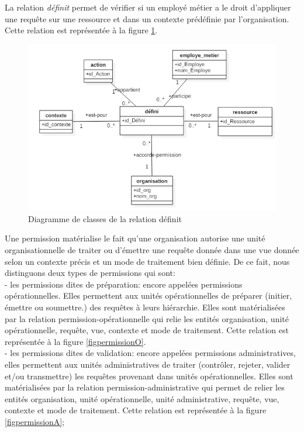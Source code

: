 \label{sectionDéfinit}

 La relation \textit{définit} permet de vérifier si un employé métier a le droit d'appliquer une requête sur une ressource et dans un contexte prédéfinie par l'organisation. Cette relation est représentée à la figure \ref{figdefini}.

\begin{figure}[h!]
    \centering
		\includegraphics[scale=0.7]{chap3/images/defini.png}
    \caption{Diagramme de classes de la relation définit}
	 \label{figdefini}
\end{figure} 

\label{sectionPermission}

Une permission matérialise le fait qu'une organisation autorise une unité organisationnelle de traiter ou d'émettre une requête donnée dans une vue donnée selon un contexte précis et un mode de traitement bien définie. De ce fait, nous distinguons deux types de permissions qui sont:\\
- les permissions dites de préparation: encore appelées permissions opérationnelles. Elles permettent aux unités opérationnelles de préparer (initier, émettre ou soumettre.) des requêtes à leurs hiérarchie. Elles sont matérialisées par la relation permission-opérationnelle qui relie les entités organisation, unité opérationnelle, requête, vue, contexte et mode de traitement. Cette relation est représentée à la figure \ref{figpermissionO}.\\
- les permissions dites de validation: encore appelées permissions administratives, elles permettent aux unités administratives de traiter (contrôler, rejeter, valider et/ou transmettre) les requêtes  provenant dans unités opérationnelles. Elles sont matérialisées par la relation permission-administrative qui permet de relier les entités organisation, unité opérationnelle, unité administrative, requête, vue, contexte et mode de traitement. Cette relation est représentée à la figure \ref{figpermissionA};

